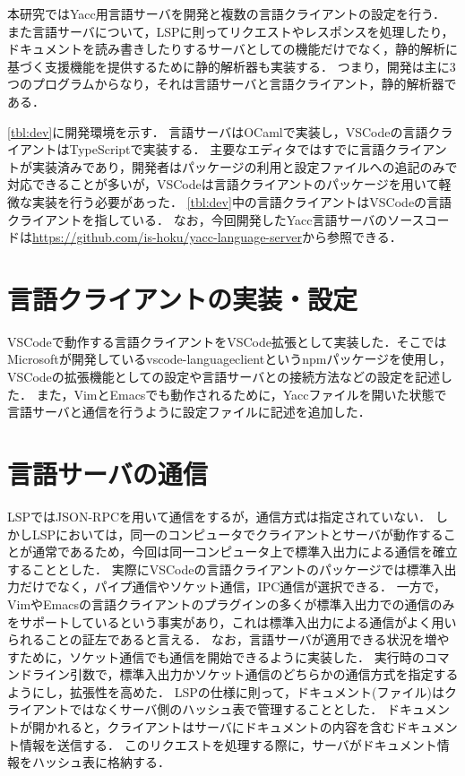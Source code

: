 \documentclass[fontsize=9bp,twocolumn,column_gap=2.36zw,a4paper,report]{jlreq}
\begin{document}
本研究ではYacc用言語サーバを開発と複数の言語クライアントの設定を行う．
また言語サーバについて，LSPに則ってリクエストやレスポンスを処理したり，ドキュメントを読み書きしたりするサーバとしての機能だけでなく，静的解析に基づく支援機能を提供するために静的解析器も実装する．
つまり，開発は主に3つのプログラムからなり，それは言語サーバと言語クライアント，静的解析器である．\par
\ref{tbl:dev}に開発環境を示す．
言語サーバはOCamlで実装し，VSCodeの言語クライアントはTypeScriptで実装する．
主要なエディタではすでに言語クライアントが実装済みであり，開発者はパッケージの利用と設定ファイルへの追記のみで対応できることが多いが，VSCodeは言語クライアントのパッケージを用いて軽微な実装を行う必要があった．
\ref{tbl:dev}中の言語クライアントはVSCodeの言語クライアントを指している．
なお，今回開発したYacc言語サーバのソースコードは\url{https://github.com/is-hoku/yacc-language-server}から参照できる．

\section{言語クライアントの実装・設定}\label{sec:client}

VSCodeで動作する言語クライアントをVSCode拡張として実装した．そこではMicrosoftが開発しているvscode-languageclientというnpmパッケージを使用し，VSCodeの拡張機能としての設定や言語サーバとの接続方法などの設定を記述した．
また，VimとEmacsでも動作されるために，Yaccファイルを開いた状態で言語サーバと通信を行うように設定ファイルに記述を追加した．

\section{言語サーバの通信}

LSPではJSON-RPCを用いて通信をするが，通信方式は指定されていない．
しかしLSPにおいては，同一のコンピュータでクライアントとサーバが動作することが通常であるため，今回は同一コンピュータ上で標準入出力による通信を確立することとした．
実際にVSCodeの言語クライアントのパッケージでは標準入出力だけでなく，パイプ通信やソケット通信，IPC通信が選択できる．
一方で，VimやEmacsの言語クライアントのプラグインの多くが標準入出力での通信のみをサポートしているという事実があり，これは標準入出力による通信がよく用いられることの証左であると言える．
なお，言語サーバが適用できる状況を増やすために，ソケット通信でも通信を開始できるように実装した．
実行時のコマンドライン引数で，標準入出力かソケット通信のどちらかの通信方式を指定するようにし，拡張性を高めた．
LSPの仕様に則って，ドキュメント(ファイル)はクライアントではなくサーバ側のハッシュ表で管理することとした．
ドキュメントが開かれると，クライアントはサーバにドキュメントの内容を含むドキュメント情報を送信する．
このリクエストを処理する際に，サーバがドキュメント情報をハッシュ表に格納する．
\end{document}
